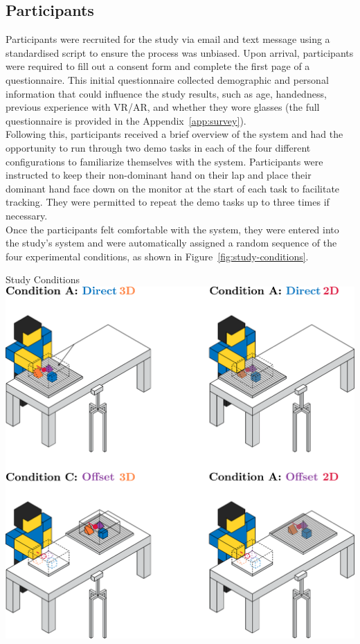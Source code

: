 \subsection{Participants}

Participants were recruited for the study via email and text message using a standardised script to ensure the process was unbiased. Upon arrival, participants were required to fill out a consent form and complete the first page of a questionnaire. This initial questionnaire collected demographic and personal information that could influence the study results, such as age, handedness, previous experience with VR/AR, and whether they wore glasses (the full questionnaire is provided in the Appendix~\ref{app:survey}). \\

Following this, participants received a brief overview of the system and had the opportunity to run through two demo tasks in each of the four different configurations to familiarize themselves with the system. Participants were instructed to keep their non-dominant hand on their lap and place their dominant hand face down on the monitor at the start of each task to facilitate tracking. They were permitted to repeat the demo tasks up to three times if necessary. \\

Once the participants felt comfortable with the system, they were entered into the study's system and were automatically assigned a random sequence of the four experimental conditions, as shown in Figure~\ref{fig:study-conditions}.

\begin{figureBox}[label={fig:study-conditions}, width=0.8\linewidth]{Study Conditions}
\includegraphics[width = 0.8\linewidth]{./implementation/figures/study-conditions.pdf}
\end{figureBox}

